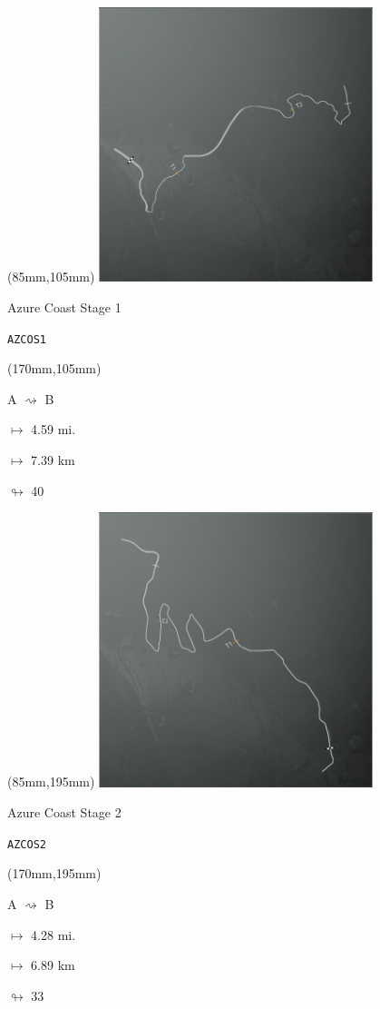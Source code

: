 \begin{textblock*}{80mm}(85mm,105mm)%
\includegraphics[width=80mm]{TR/2015-05-20_00003.png}
\centerline{Azure Coast Stage 1}
\par\hfill\tiny\tt AZCOS1\\
\end{textblock*}
\begin{textblock*}{30mm}(170mm,105mm)%
\par A $\rightsquigarrow$ B
\Large
\par$\mapsto$ 4.59 mi.
\par$\mapsto$ 7.39 km
\par$\looparrowright$ 40
\end{textblock*}
\begin{textblock*}{80mm}(85mm,195mm)%
\includegraphics[width=80mm]{TR/2015-05-20_00004.png}
\centerline{Azure Coast Stage 2}
\par\hfill\tiny\tt AZCOS2\\
\end{textblock*}
\begin{textblock*}{30mm}(170mm,195mm)%
\par A $\rightsquigarrow$ B
\Large
\par$\mapsto$ 4.28 mi.
\par$\mapsto$ 6.89 km
\par$\looparrowright$ 33
\end{textblock*}
\null\newpage

